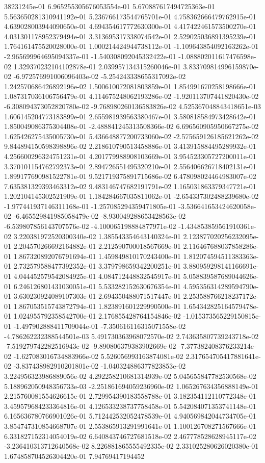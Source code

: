 38231245e-01	6.965255305676053554e-01	5.670887617494725363e-01	5.563650281310941192e-01	5.236766173544765701e-01	4.758362666479762915e-01	4.639028003944090650e-01	4.694354617772630300e-01	4.417422461573500270e-01	4.031301178952379494e-01	3.313695317338074542e-01	2.529025036891395239e-01	1.764161475520028000e-01	1.000214424944738112e-01	-1.109643854092163262e-01	-2.965699964695094337e-01	-1.540308092045332422e-01	-1.088802011617476598e-02	1.329370232104102878e-01	2.039957134315260046e-01	3.833709814996159870e-02	-6.972576991006096403e-02	-5.254243338655317092e-02	1.242570686426892196e-02	1.500610072081803859e-01	1.854991670258198666e-01	1.087317036106756479e-01	4.114675248062193286e-02	-1.920113707441820430e-02	-6.308094373052820780e-02	-9.768980260136583826e-02	4.525367048843418651e-03	1.606145204773183899e-01	2.655981939563380467e-01	3.580818584973428642e-01	1.850049086375304408e-01	-2.488841245313508366e-02	6.696560905950667275e-02	1.625426275435005730e-01	5.436648877200733060e-02	-2.575659126185621262e-02	9.844894150598398896e-02	2.218610790513458886e-01	3.413915884495289932e-01	4.256600296324751231e-01	4.201779988908103669e-01	3.954523305727200011e-01	3.370101154762792373e-01	2.894726551495320210e-01	2.556406626718402131e-01	1.899177690981522781e-01	9.521719375891715686e-02	6.478098024464983007e-02	7.635381329393463312e-02	9.483146747682191791e-02	1.165031863379347721e-01	1.202104145302521909e-01	1.184284667035811062e-01	-2.654337302488239680e-02	-1.977441937146311168e-01	-1.257085294359471805e-01	-3.536641653424620058e-02	-6.465529841985058479e-02	-8.930049288653428563e-02	-6.539807856143707576e-02	-4.100065198884877971e-02	-1.434853859561910361e-02	3.220381972520300340e-02	1.385543354643140324e-01	2.123877020256232095e-01	2.204570266692164882e-01	2.212590700018567669e-01	2.116467688037858286e-01	1.867320892076791694e-01	1.459849810170243400e-01	1.812074594511383363e-01	2.732579588477392352e-01	3.379798659342200251e-01	3.880959298141166691e-01	4.044452579542084925e-01	4.084712448832545917e-01	5.058839587689044626e-01	6.246126801431030051e-01	5.533282152630676354e-01	4.595356314289594790e-01	3.630230924089107303e-01	2.694350488071517447e-01	2.253588766218237172e-01	1.867053515743872794e-01	1.823891601229990500e-01	1.654342825164579478e-01	1.024955792358542700e-01	2.176855428764154846e-02	-1.015373565229150815e-01	-1.497902888411709044e-01	-7.350616116315071558e-02	-4.786262232388544501e-03	5.491730363968072570e-02	2.743635807739243718e-02	-7.519279742282516943e-02	-9.890806379383902669e-02	-7.377382408376233214e-02	-1.627083016734883966e-02	5.526056993163874081e-02	2.317654705417881641e-02	-3.837438982910201801e-02	-1.040324886377823853e-02	3.224956323986889056e-02	4.292258210681314939e-02	5.045655847782530568e-02	5.188962050948356733e-03	-2.251861694059236960e-02	1.065267634356888149e-01	2.215760081554626615e-01	2.729954390183558788e-01	3.182354112110772348e-01	3.459579684233364816e-01	4.126533238737758458e-01	5.542084071353741148e-01	6.165636780766901026e-01	5.712442532052478539e-01	4.940569842044734705e-01	3.854747310854668707e-01	2.553865913291991641e-01	1.100126708271567666e-01	6.331827152314054019e-02	6.640843746727681518e-02	2.467778528628945117e-02	-3.236410313712640568e-02	8.226881865555492335e-02	2.331025280626020380e-01	1.674858704526304420e-01	7.94769417194452
